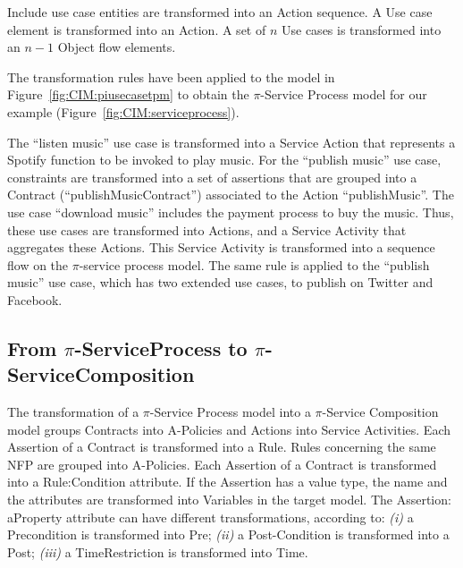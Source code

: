 \documentclass{singlecol-new}
\theoremstyle{TH}{
\newtheorem{lemma}{Lemma}
\newtheorem{theorem}[lemma]{Theorem}
\newtheorem{corrolary}[lemma]{Corrolary}
\newtheorem{conjecture}[lemma]{Conjecture}
\newtheorem{proposition}[lemma]{Proposition}
\newtheorem{claim}[lemma]{Claim}
\newtheorem{stheorem}[lemma]{Wrong Theorem}
\newtheorem{algorithm}{Algorithm}
}
\theoremstyle{THrm}{
\newtheorem{definition}{Definition}[section]
\newtheorem{question}{Question}[section]
\newtheorem{remark}{Remark}
\newtheorem{scheme}{Scheme}
}
\theoremstyle{THhit}{
\newtheorem{case}{Case}[section]
}
\theoremstyle{THhsl}{
\newtheorem{example}{Example}
}
\begin{document}
{\sf Include} use case entities are transformed into an {\sf Action} sequence.
A {\sc Use case} element is transformed into an {\sf Action}. 
A set of $n$ {\sc Use cases} is transformed into an  $n-1$ {\sf Object flow} elements. 
%

\begin{example}\label{ex:toPublicMusicT1} 
The transformation rules have been applied to the model in Figure~\ref{fig:CIM:piusecasetpm} to obtain the $\pi$-Service Process model for our example (Figure~\ref{fig:CIM:serviceprocess}).



The ``listen music'' use case is transformed into a Service Action that  represents a Spotify  function to be invoked to play music. 
For the ``publish music'' use case,  constraints are transformed into a set of assertions that are grouped into a Contract ({\sf ``publishMusicContract''}) associated to the Action {\sf ``publishMusic''}. 
The use case ``download music''  includes the payment process to buy the music. 
Thus, these use cases  are transformed into {\sf Actions}, and a {\sf Service Activity} that aggregates these {\sf Actions}.   
This \textsf{Service Activity} is transformed into a sequence flow on the $\pi$-service process model.
The same rule is applied to the ``publish music'' use case, which has two extended use cases, to publish on Twitter and Facebook.
 \end{example}

\subsection{From $\pi$-ServiceProcess to $\pi$-ServiceComposition}


The transformation  of a  $\pi$-Service Process model into a $\pi$-Service Composition model groups {\sf Contracts} into {\sf A-Policies} and {\sf Actions} into {\sf Service Activities}.   
Each {\sf Assertion} of a {\sf Contract} is transformed into a {\sf Rule}. 
{\sf Rules}  concerning the same NFP  are grouped into {\sf A-Policies}. 
Each {\sf Assertion} of a {\sf Contract} is transformed into a {\sf Rule:Condition} attribute. 
If the {\sf Assertion} has a value type, the name and the attributes are transformed into {\sf Variables} in the target model.  
The {\sf Assertion: aProperty} attribute can have different transformations, according to: 
\textit{(i)} a {\sf Precondition} is transformed into {\sf Pre};
\textit{(ii)} a {\sf Post-Condition} is transformed into a {\sf  Post};
\textit{(iii)} a {\sf TimeRestriction} is transformed into {\sf Time}.
\end{document}
